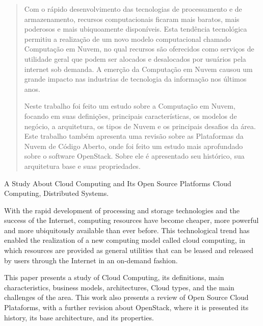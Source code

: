 \documentclass[ti]{texufpel}
\begin{document}
\begin{abstract}
  Com o rápido desenvolvimento das tecnologias de processamento e de armazenamento, recursos computacionais ficaram mais baratos, mais poderosos e mais ubiquoamente disponíveis. Esta tendência tecnológica permitiu a realização de um novo modelo computacional chamado Computação em Nuvem, no qual recursos são oferecidos como serviços de utilidade geral que podem ser alocados e desalocados por usuários pela internet sob demanda. A emerção da Computação em Nuvem causou um grande impacto nas industrias de tecnologia da informação nos últimos anos.

  Neste trabalho foi feito um estudo sobre a Computação em Nuvem, focando em suas definições, principais características, os modelos de negócio, a arquitetura, os tipos de Nuvem e os principais desafios da área. Este trabalho também apresenta uma revisão sobre as Plataformas da Nuvem de Código Aberto, onde foi feito um estudo mais aprofundado sobre o software OpenStack. Sobre ele é apresentado seu histórico, sua arquitetura base e suas propriedades.

\end{abstract}
\begin{englishabstract}%
  {A Study About Cloud Computing and Its Open Source Platforms}%
  {Cloud Computing, Distributed Systems.}
  
With the rapid development of processing and storage technologies and the success of the Internet, computing resources have become cheaper, more powerful and more ubiquitously available than ever before. This technological trend has enabled the realization of a new computing model called cloud computing, in which resources are provided as general utilities that can be leased and released by users through the Internet in an on-demand fashion.

This paper presents a study of Cloud Computing, its definitions, main characteristics, business models, architectures, Cloud types,  and the main challenges of the area. This work also presents a review of Open Source Cloud Plataforms, with a further revision about OpenStack, where it is presented its history, its base architecture, and its properties.

  
\end{englishabstract}

\listoffigures

\listoftables
\end{document}
